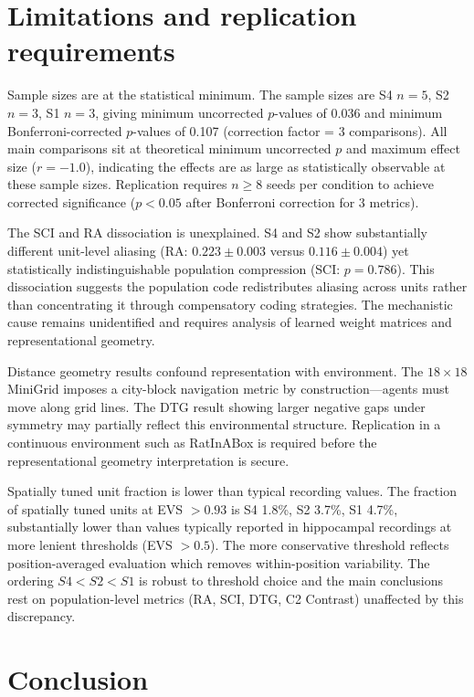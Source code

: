 \documentclass[11pt, a4paper]{article}
\begin{document}
\clearpage

\section*{Limitations and replication requirements}

Sample sizes are at the statistical minimum. The sample sizes are S4 $n=5$, S2 $n=3$, S1 $n=3$, giving minimum uncorrected $p$-values of 0.036 and minimum Bonferroni-corrected $p$-values of 0.107 (correction factor = 3 comparisons). All main comparisons sit at theoretical minimum uncorrected $p$ and maximum effect size ($r = -1.0$), indicating the effects are as large as statistically observable at these sample sizes. Replication requires $n \geq 8$ seeds per condition to achieve corrected significance ($p < 0.05$ after Bonferroni correction for 3 metrics).

The SCI and RA dissociation is unexplained. S4 and S2 show substantially different unit-level aliasing (RA: $0.223 \pm 0.003$ versus $0.116 \pm 0.004$) yet statistically indistinguishable population compression (SCI: $p = 0.786$). This dissociation suggests the population code redistributes aliasing across units rather than concentrating it through compensatory coding strategies. The mechanistic cause remains unidentified and requires analysis of learned weight matrices and representational geometry.

Distance geometry results confound representation with environment. The $18 \times 18$ MiniGrid imposes a city-block navigation metric by construction---agents must move along grid lines. The DTG result showing larger negative gaps under symmetry may partially reflect this environmental structure. Replication in a continuous environment such as RatInABox is required before the representational geometry interpretation is secure.

Spatially tuned unit fraction is lower than typical recording values. The fraction of spatially tuned units at EVS $> 0.93$ is S4 1.8\%, S2 3.7\%, S1 4.7\%, substantially lower than values typically reported in hippocampal recordings at more lenient thresholds (EVS $> 0.5$). The more conservative threshold reflects position-averaged evaluation which removes within-position variability. The ordering $S4 < S2 < S1$ is robust to threshold choice and the main conclusions rest on population-level metrics (RA, SCI, DTG, C2 Contrast) unaffected by this discrepancy.

\clearpage

\section*{Conclusion}
\end{document}
